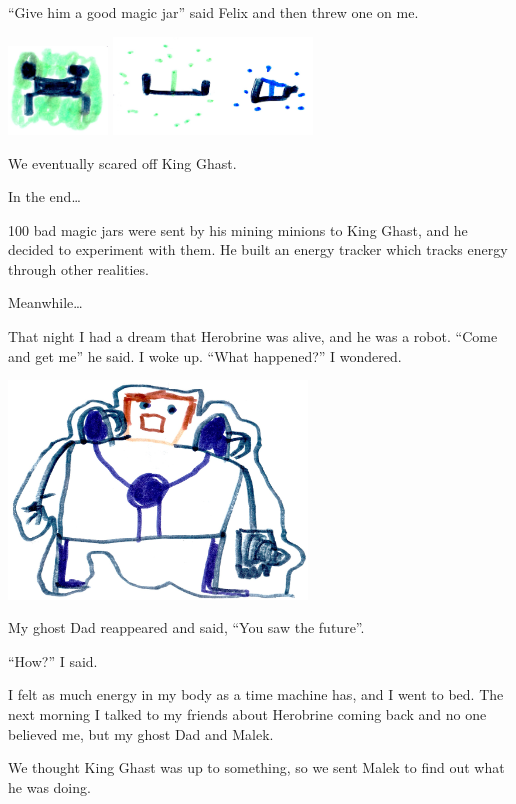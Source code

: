 \documentclass[12pt,twoside]{krantz}
\begin{document}
``Give him a good magic jar'' said Felix and then threw one on me.

\includegraphics[width=1.04167in,height=\textheight]{img/king-ghast/06-creeper.jpg}
\includegraphics[width=2.08333in,height=\textheight]{img/king-ghast/06-dots.jpg}

We eventually scared off King Ghast.

In the end\ldots{}

100 bad magic jars were sent by his mining minions to King Ghast, and he
decided to experiment with them. He built an energy tracker which tracks
energy through other realities.

Meanwhile\ldots{}

That night I had a dream that Herobrine was alive, and he was a robot.
``Come and get me'' he said. I woke up. ``What happened?'' I wondered.

\includegraphics[width=3.125in,height=\textheight]{img/king-ghast/09-herobrine.jpg}

My ghost Dad reappeared and said, ``You saw the future''.

``How?'' I said.

I felt as much energy in my body as a time machine has, and I went to
bed. The next morning I talked to my friends about Herobrine coming back
and no one believed me, but my ghost Dad and Malek.

We thought King Ghast was up to something, so we sent Malek to find out
what he was doing.
\end{document}
